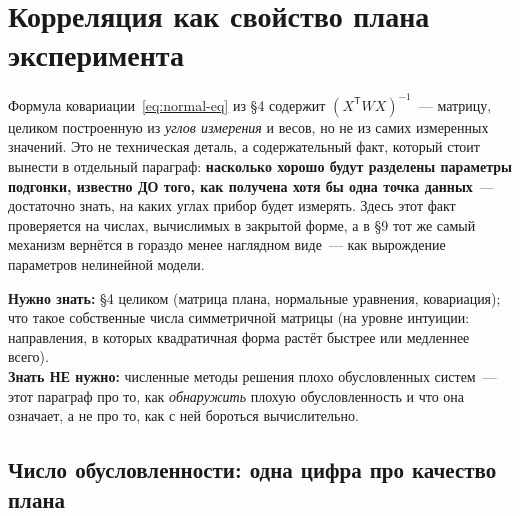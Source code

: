 %
%
\section{Корреляция как свойство плана эксперимента}
\label{sec:correlation}

Формула ковариации~\eqref{eq:normal-eq} из §4 содержит $(X^{\mathsf T}WX)^{-1}$~--- матрицу,
целиком построенную из \emph{углов измерения} и весов, но не из самих измеренных значений. Это
не техническая деталь, а содержательный факт, который стоит вынести в отдельный параграф:
\textbf{насколько хорошо будут разделены параметры подгонки, известно ДО того, как получена хотя
бы одна точка данных}~--- достаточно знать, на каких углах прибор будет измерять. Здесь этот факт
проверяется на числах, вычислимых в закрытой форме, а в §9 тот же самый механизм вернётся в
гораздо менее наглядном виде~--- как вырождение параметров нелинейной модели.

\begin{tcolorbox}[enhanced,colback=cPanel,colframe=cGrid,boxrule=0.8pt,arc=2pt,
                  title={\bfseries\color{cAccent} Пререквизиты},coltitle=cAccent,
                  attach boxed title to top left={xshift=6pt,yshift=-2pt},
                  boxed title style={colback=cPanel,boxrule=0pt,arc=0pt},top=10pt]
\textbf{Нужно знать:} §4 целиком (матрица плана, нормальные уравнения, ковариация); что такое
собственные числа симметричной матрицы (на уровне интуиции: направления, в которых квадратичная
форма растёт быстрее или медленнее всего).\\[0.3em]
\textbf{Знать НЕ нужно:} численные методы решения плохо обусловленных систем~--- этот параграф про
то, как \emph{обнаружить} плохую обусловленность и что она означает, а не про то, как с ней
бороться вычислительно.
\end{tcolorbox}

\subsection{Число обусловленности: одна цифра про качество плана}
\label{subsec:condition-number}

